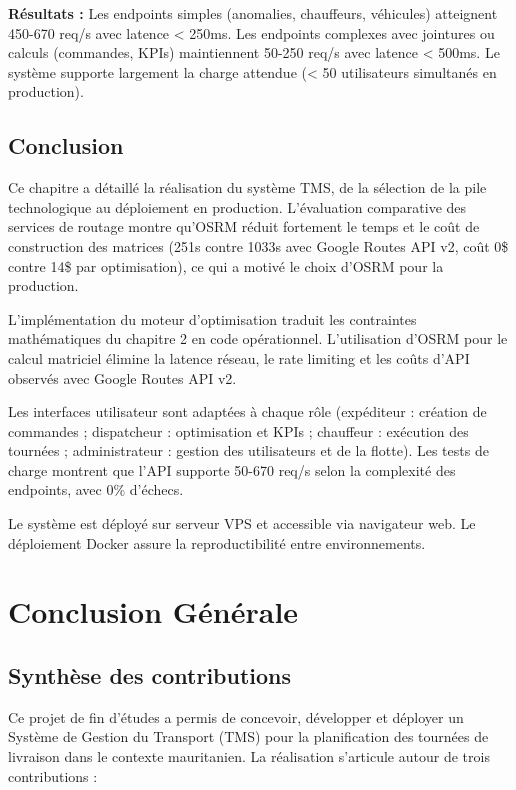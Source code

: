 \documentclass[12pt,a4paper]{report}
\begin{document}
\textbf{Résultats :} Les endpoints simples (anomalies, chauffeurs, véhicules) atteignent 450-670 req/s avec latence < 250ms. Les endpoints complexes avec jointures ou calculs (commandes, KPIs) maintiennent 50-250 req/s avec latence < 500ms. Le système supporte largement la charge attendue (< 50 utilisateurs simultanés en production).

\section{Conclusion}

Ce chapitre a détaillé la réalisation du système TMS, de la sélection de la pile technologique au déploiement en production. L'évaluation comparative des services de routage montre qu'OSRM réduit fortement le temps et le coût de construction des matrices (251s contre 1033s avec Google Routes API v2, coût 0\$ contre 14\$ par optimisation), ce qui a motivé le choix d'OSRM pour la production.

L'implémentation du moteur d'optimisation traduit les contraintes mathématiques du chapitre 2 en code opérationnel. L'utilisation d'OSRM pour le calcul matriciel élimine la latence réseau, le rate limiting et les coûts d'API observés avec Google Routes API v2.

Les interfaces utilisateur sont adaptées à chaque rôle (expéditeur : création de commandes ; dispatcheur : optimisation et KPIs ; chauffeur : exécution des tournées ; administrateur : gestion des utilisateurs et de la flotte). Les tests de charge montrent que l'API supporte 50-670 req/s selon la complexité des endpoints, avec 0\% d'échecs.

Le système est déployé sur serveur VPS et accessible via navigateur web. Le déploiement Docker assure la reproductibilité entre environnements.

\chapter*{Conclusion Générale}

\section*{Synthèse des contributions}

Ce projet de fin d'études a permis de concevoir, développer et déployer un Système de Gestion du Transport (TMS) pour la planification des tournées de livraison dans le contexte mauritanien. La réalisation s'articule autour de trois contributions :
\end{document}
